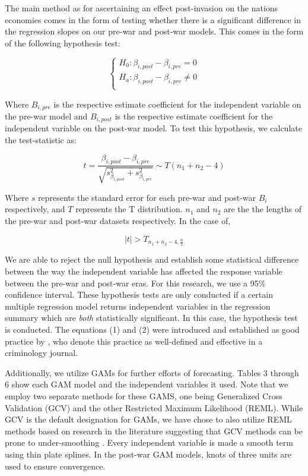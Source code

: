 \documentclass[11pt,regno]{amsart}
\theoremstyle{plain}
\numberwithin{equation}{section}
\begin{document}
The main method as for ascertaining an effect post-invasion on the nations economies comes in the form of testing whether there is a significant difference in the regression slopes on our pre-war and post-war models. This comes in the form of the following hypothesis test:


\begin{equation} \tag{1}
 \begin{cases} 
      H_0: \beta_{i,post} - \beta_{i,pre} = 0 \\
      H_a:\beta_{i,post} - \beta_{i,pre} \neq 0 \\
   \end{cases}
\end{equation} 

Where $B_{i,pre}$ is the respective estimate coefficient for the independent variable on the pre-war model and $B_{i,post}$ is the respective estimate coefficient for the independent variable on the post-war model. To test this hypothesis, we calculate the test-statistic as:



\begin{equation} \tag{2}
t = \frac{\beta_{i,post}- \beta_{i,pre}}{\sqrt{s_{\beta_{i,post}}^2+s_{\beta_{i,pre}}^2}} \sim T(n_1 +n_2 -4)
\end{equation} 

Where $s$ represents the standard error for each pre-war and post-war $B_i$ respectively, and $T$ represents the T distribution. $n_1$ and $n_2$ are the the lengths of the pre-war and post-war datasets respectively. In the case of,


\begin{equation} \tag{3}
|t| > T_{n_1+n_2-4, \frac{\alpha}{2}}
\end{equation} 

We are able to reject the null hypothesis and establish some statistical difference between the way the independent variable has affected the response variable between the pre-war and post-war eras. For this research, we use a 95$\%$ confidence interval. These hypothesis tests are only conducted if a certain multiple regression model returns independent variables in the regression summary which are \textit{both} statistically significant. In this case, the hypothesis test is conducted. The equations (1) and (2) were introduced and established as good practice by \cite{correct_stats}, who denote this practice as well-defined and effective in a criminology journal.

Additionally, we utilize GAMs for further efforts of forecasting. Tables 3 through 6 show each GAM model and the independent variables it used. Note that we employ two separate methods for these GAMS, one being Generalized Cross Validation (GCV) and the other Restricted Maximum Likelihood (REML). While GCV is the default designation for GAMs, we have chose to also utilize REML methods based on research in the literature suggesting that GCV methods can be prone to under-smoothing \cite{GAM_wood}. Every independent variable is made a smooth term using thin plate splines. In the post-war GAM models, knots of three units are used to ensure convergence.
\end{document}
